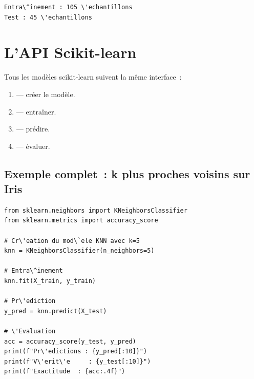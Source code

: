 \begin{codeoutput}
\begin{verbatim}
Entra\^inement : 105 \'echantillons
Test : 45 \'echantillons
\end{verbatim}
\end{codeoutput}

\section{L'API Scikit-learn}
\label{sec:api_sklearn}


\begin{bonnepratique}
Tous les mod\`eles scikit-learn suivent la m\^eme interface~:
\begin{enumerate}
    \item {} --- cr\'eer le mod\`ele.
    \item {} --- entra\^iner.
    \item {} --- pr\'edire.
    \item {} --- \'evaluer.
\end{enumerate}
\end{bonnepratique}

\subsection{Exemple complet~: k plus proches voisins sur Iris}


\begin{codeblock}[title=\textbf{Python}]
\begin{verbatim}
from sklearn.neighbors import KNeighborsClassifier
from sklearn.metrics import accuracy_score

# Cr\'eation du mod\`ele KNN avec k=5
knn = KNeighborsClassifier(n_neighbors=5)

# Entra\^inement
knn.fit(X_train, y_train)

# Pr\'ediction
y_pred = knn.predict(X_test)

# \'Evaluation
acc = accuracy_score(y_test, y_pred)
print(f"Pr\'edictions : {y_pred[:10]}")
print(f"V\'erit\'e     : {y_test[:10]}")
print(f"Exactitude  : {acc:.4f}")
\end{verbatim}
\end{codeblock}

